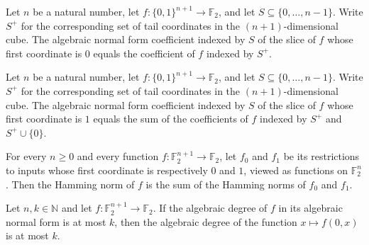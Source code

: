 \begin{theorem}
\label{FABL.anfCoeff_firstCoordinateSlice_zero}
\leanok
{}
Let $n$ be a natural number, let $f:\{0,1\}^{n+1}\to\mathbb F_2$, and let
$S\subseteq\{0,\ldots,n-1\}$. Write $S^+$ for the corresponding set of tail coordinates
in the $(n+1)$-dimensional cube. The algebraic normal form coefficient indexed by $S$ of
the slice of $f$ whose first coordinate is $0$ equals the coefficient of $f$ indexed by
$S^+$.
\end{theorem}

\begin{theorem}
\label{FABL.anfCoeff_firstCoordinateSlice_one}
\leanok
{}
Let $n$ be a natural number, let $f:\{0,1\}^{n+1}\to\mathbb{F}_2$, and let
$S\subseteq\{0,\ldots,n-1\}$. Write $S^+$ for the corresponding set of tail coordinates
in the $(n+1)$-dimensional cube. The algebraic normal form coefficient indexed by $S$ of
the slice of $f$ whose first coordinate is $1$ equals the sum of the coefficients of $f$
indexed by $S^+$ and $S^+\cup\{0\}$.
\end{theorem}

\begin{theorem}
\label{FABL.hammingNorm_firstCoordinateSlices}
\leanok
{}
For every $n\ge 0$ and every function $f:\mathbb F_2^{n+1}\to\mathbb F_2$, let $f_0$ and
$f_1$ be its restrictions to inputs whose first coordinate is respectively $0$ and $1$,
viewed as functions on $\mathbb F_2^n$. Then the Hamming norm of $f$ is the sum of the
Hamming norms of $f_0$ and $f_1$.
\end{theorem}

\begin{theorem}
\label{FABL.firstCoordinateSlice_zero_degree_le}
\leanok
{}
Let $n,k\in\mathbb N$ and let $f:\mathbb F_2^{n+1}\to\mathbb F_2$. If the algebraic
degree of $f$ in its algebraic normal form is at most $k$, then the algebraic degree of
the function $x\mapsto f(0,x)$ is at most $k$.
\end{theorem}

